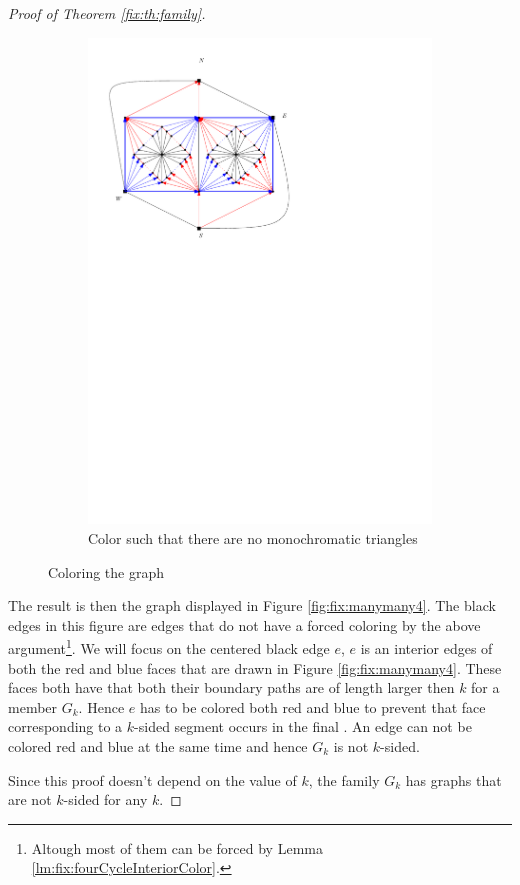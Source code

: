 \begin{proof}[Proof of Theorem \ref{fix:th:family}]
\begin{figure}[h]
\begin{subfigure}[t]{0.3\textwidth}
      \includegraphics[width=\te have done xtwidth]{fixExtension/img/manymany3}
      \caption{Color such that there are no monochromatic triangles}
      \label{fig:fix:manymany3}
    \end{subfigure}
    \caption{Coloring the graph}
    \label{fig:fix:coloring}
  \end{figure}

  The result is then the graph displayed in Figure \ref{fig:fix:manymany4}. The black edges in this figure are edges that do not have a forced coloring by the above argument\footnote{Altough most of them can be forced by Lemma \ref{lm:fix:fourCycleInteriorColor}.}.
  We will focus on the centered black edge $e$, $e$ is an interior edges of both the red and blue faces that are drawn  in Figure \ref{fig:fix:manymany4}. These faces both have that both their boundary paths are of length larger then $k$ for a member $G_k$. Hence $e$ has to be colored both red and blue to prevent that face corresponding to a $k$-sided segment occurs in the final \rel. An edge can not be colored red and blue at the same time and hence $G_k$ is not $k$-sided.

  Since this proof doesn't depend on the value of $k$, the family $G_k$ has graphs that are not $k$-sided for any $k$.
\end{proof}


